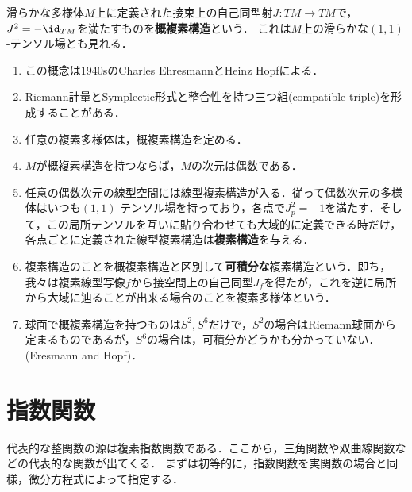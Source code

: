 \documentclass[uplatex, dvipdfmx]{jsreport}
\begin{document}
\begin{definition}
    滑らかな多様体$M$上に定義された接束上の自己同型射$J:TM\to TM$で，$J^2=-\id_{TM}$を満たすものを\textbf{概複素構造}という．
    これは$M$上の滑らかな$(1,1)$-テンソル場とも見れる．
\end{definition}
\begin{remark}
    \begin{enumerate}
        \item この概念は1940sのCharles EhresmannとHeinz Hopfによる．
        \item Riemann計量とSymplectic形式と整合性を持つ三つ組(compatible triple)を形成することがある．
        \item 任意の複素多様体は，概複素構造を定める．
        \item $M$が概複素構造を持つならば，$M$の次元は偶数である．
        \item 任意の偶数次元の線型空間には線型複素構造が入る．従って偶数次元の多様体はいつも$(1,1)$-テンソル場を持っており，各点で$J_p^2=-1$を満たす．そして，この局所テンソルを互いに貼り合わせても大域的に定義できる時だけ，各点ごとに定義された線型複素構造は\textbf{複素構造}を与える．
        \item 複素構造のことを概複素構造と区別して\textbf{可積分な}複素構造という．即ち，我々は複素線型写像$f$から接空間上の自己同型$J_f$を得たが，これを逆に局所から大域に辿ることが出来る場合のことを複素多様体という．
        \item 球面で概複素構造を持つものは$S^2,S^6$だけで，$S^2$の場合はRiemann球面から定まるものであるが，$S^6$の場合は，可積分かどうかも分かっていない．(Eresmann and Hopf)．
    \end{enumerate}
\end{remark}

\section{指数関数}

\begin{screen}
    代表的な整関数の源は複素指数関数である．ここから，三角関数や双曲線関数などの代表的な関数が出てくる．
    まずは初等的に，指数関数を実関数の場合と同様，微分方程式によって指定する．
\end{screen}
\end{document}
